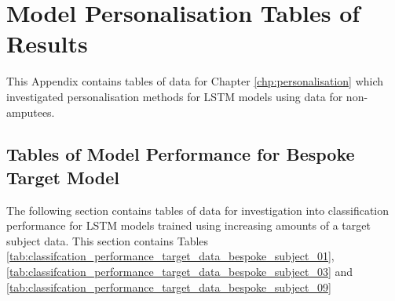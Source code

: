 \chapter{Model Personalisation Tables of Results}
This Appendix contains tables of data for Chapter \ref{chp:personalisation} which investigated personalisation methods for LSTM models using data for non-amputees.

\section{Tables of Model Performance for Bespoke Target Model}
\label{sec:appendix-a-model-performance-bespoke}
The following section contains tables of data for investigation into classification performance for LSTM models trained using increasing amounts of a target subject data. This section contains Tables \ref{tab:classifcation_performance_target_data_bespoke_subject_01}, \ref{tab:classifcation_performance_target_data_bespoke_subject_03} and \ref{tab:classifcation_performance_target_data_bespoke_subject_09}
\vfill
\  \\
